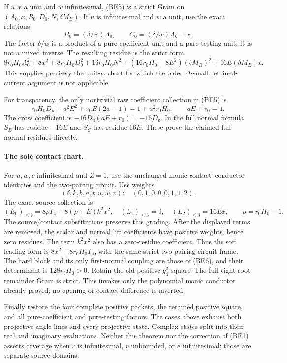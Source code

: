 If $u$ is a unit and $w$ infinitesimal, (BE5) is a strict Gram on
$(A_0,x,B_0,D_0,N,\delta M_B)$. If $u$ is infinitesimal and $w$ a
unit, use the exact relations
\[
 B_0=(\delta/w)A_0,\qquad C_0=(\delta/w)A_0-x.
\]
The factor $\delta/w$ is a product of a pure-coefficient unit and a
pure-testing unit; it is not a mixed inverse. The resulting residue
is the strict form
\[
 8r_0H_0A_0^2+8x^2+8r_0H_0D_0^2
 +16r_0H_0N^2+(16r_0H_0+8E^2)(\delta M_B)^2
 +16E(\delta M_B)x.                                  \tag{BE6}
\]
This supplies precisely the unit-$w$ chart for which the older
$\Delta$-small retained-current argument is not applicable.

For transparency, the only nontrivial raw coefficient collection in
(BE5) is
\[
 r_0H_0D_u+a^2E^2+r_0E(2a-1)=1+u^2r_0H_0,
 \qquad aE+r_0=1.
\]
The cross coefficient is $-16D_u(aE+r_0)=-16D_u$.
In the full normal formula $S_B$ has residue $-16E$ and $S_C$ has
residue $16E$. These prove the claimed full normal residues directly.

\paragraph{The sole contact chart.}
For $u,w,v$ infinitesimal and $Z=1$, use the unchanged monic
contact--conductor identities and the two-pairing circuit. Use weights
\[ (\delta,k,b,a,t,u,w,v):\quad(0,1,0,0,0,1,1,2). \]
The exact source collection is
\[
 (E_0)_{\le6}=8\rho T_4-8(\rho+E)k^2x^2,
 \quad (L_1)_{\le3}=0,\quad (L_2)_{\le3}=16Ex,
 \qquad \rho=r_0H_0-1.
\]
The source/contact substitutions preserve this grading. After the
displayed terms are removed, the scalar and normal lift coefficients
have positive weights, hence zero residues. The term $k^2x^2$ also
has a zero-residue coefficient. Thus the soft leading form is
$8x^2+8r_0H_0T_4$, with the same strict two-pairing circuit frame.
The hard block and its only first-normal coupling are those of (BE6),
and their determinant is $128r_0H_0>0$. Retain the old positive
$g_4^2$ square. The full eight-root remainder Gram is strict.
This invokes only the polynomial monic conductor already proved;
no opening or contact difference is inverted.

Finally restore the four complete positive packets, the retained
positive square, and all pure-coefficient and pure-testing factors.
The cases above exhaust both projective angle lines and every
projective state. Complex states split into their real and imaginary
evaluations. Neither this theorem nor the correction of (BE1) asserts
coverage when $r$ is infinitesimal, $\eta$ unbounded, or $e$
infinitesimal; those are separate source domains.

